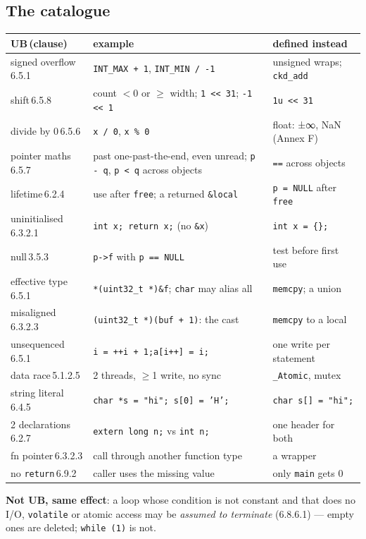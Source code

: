 \documentclass[8pt]{extarticle}
\newcommand\ct[1]{\texttt{#1}}
\newcommand\pa{\mbox{-}\mbox{>}}  %
\newcommand\cl[1]{{\color{sheetGrey}\,#1}}
\begin{document}
\begin{multicols}{2}
\section{The catalogue}
{\scriptsize\setlength{\tabcolsep}{2pt}
\begin{tabular}{@{}L{20mm}L{33mm}L{23mm}@{}}
\toprule
\textbf{UB}\cl{(clause)} & \textbf{example} & \textbf{defined instead}\\ \midrule
signed overflow\cl{6.5.1} & \ct{INT\_MAX + 1}, \ct{INT\_MIN / -1} & unsigned wraps; \ct{ckd\_add}\\
shift\cl{6.5.8} & count $<$0 or $\ge$ width; \ct{1 << 31}; \ct{-1 << 1} & \ct{1u << 31}\\
divide by 0\cl{6.5.6} & \ct{x / 0}, \ct{x \% 0} & float: ±∞, NaN (Annex F)\\
pointer maths\cl{6.5.7} & past one-past-the-end, even unread; \ct{p - q}, \ct{p < q} across objects & \ct{==} across objects\\
lifetime\cl{6.2.4} & use after \ct{free}; a returned \ct{\&local} & \ct{p = NULL} after \ct{free}\\
uninitialised\cl{6.3.2.1} & \ct{int x; return x;} (no \ct{\&x}) & \ct{int x = \{\};}\\
null\cl{3.5.3} & \ct{p\pa{}f} with \ct{p == NULL} & test before first use\\
effective type\cl{6.5.1} & \ct{*(uint32\_t *)\&f}; \ct{char} may alias all & \ct{memcpy}; a union\\
misaligned\cl{6.3.2.3} & \ct{(uint32\_t *)(buf + 1)}: the cast & \ct{memcpy} to a local\\
unsequenced\cl{6.5.1} & \ct{i = ++i + 1;}\enspace\ct{a[i++] = i;} & one write per statement\\
data race\cl{5.1.2.5} & 2 threads, $\ge$1 write, no sync & \ct{\_Atomic}, mutex\\
string literal\cl{6.4.5} & \ct{char *s = "hi"; s[0] = 'H';} & \ct{char s[] = "hi";}\\
2 declarations\cl{6.2.7} & \ct{extern long n;} vs \ct{int n;} & one header for both\\
fn pointer\cl{6.3.2.3} & call through another function type & a wrapper\\
no \ct{return}\cl{6.9.2} & caller uses the missing value & only \ct{main} gets 0\\
\bottomrule
\end{tabular}}\par
\textbf{Not UB, same effect}: a loop whose condition is not constant and that does no I/O,
\ct{volatile} or atomic access may be \emph{assumed to terminate} (6.8.6.1) — empty ones are deleted;
\ct{while (1)} is not.


\end{multicols}
\end{document}
